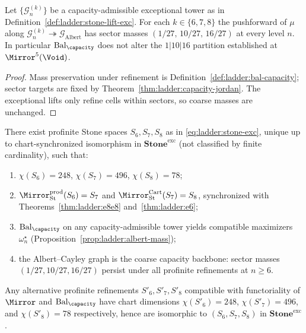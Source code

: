 \begin{proposition}
\label{prop:ladder:albert-mass}
Let $\{\mathcal{G}_n^{(k)}\}$ be a capacity-admissible exceptional tower as in
Definition~\ref{def:ladder:stone-lift-exc}. For each $k\in\{6,7,8\}$ the
pushforward of $\mu$ along
$\mathcal{G}_n^{(k)}\twoheadrightarrow\mathcal{G}_{\mathrm{Albert}}$ has sector
masses $(1/27,\,10/27,\,16/27)$ at every level $n$. In particular
$\mathrm{Bal}_\capacity$ does not alter the $1|10|16$ partition established at
$\Mirror^5(\Void)$.
\end{proposition}

\begin{proof}
Mass preservation under refinement is Definition~\ref{def:ladder:bal-capacity};
sector targets are fixed by Theorem~\ref{thm:ladder:capacity-jordan}. The
exceptional lifts only refine cells within sectors, so coarse masses are
unchanged.
\end{proof}

\begin{theorem}
\label{thm:ladder:stone-e8}
There exist profinite Stone spaces $S_6,S_7,S_8$ as in
\eqref{eq:ladder:stone-exc}, unique up to chart-synchronized isomorphism in
$\mathbf{Stone}^{\mathrm{exc}}$ (not classified by finite cardinality), such that:
\begin{enumerate}[label=(\roman*),leftmargin=*]
  \item $\chi(S_6)=248$, $\chi(S_7)=496$, $\chi(S_8)=78$;
  \item $\Mirror_{\mathrm{St}}^{\mathrm{prod}}(S_6)=S_7$ and
    $\Mirror_{\mathrm{St}}^{\mathrm{Cart}}(S_7)=S_8$, synchronized with
    Theorems~\ref{thm:ladder:e8e8} and~\ref{thm:ladder:e6};
  \item $\mathrm{Bal}_\capacity$ on any capacity-admissible tower yields
    compatible maximizers $\omega^\star_n$ (Proposition~\ref{prop:ladder:albert-mass});
  \item the Albert--Cayley graph is the coarse capacity backbone: sector masses
    $(1/27,10/27,16/27)$ persist under all profinite refinements at $n\geq6$.
\end{enumerate}
Any alternative profinite refinements $S'_6,S'_7,S'_8$ compatible
with functoriality of $\Mirror$ and $\mathrm{Bal}_\capacity$ have chart
dimensions $\chi(S'_6)=248$, $\chi(S'_7)=496$, and $\chi(S'_8)=78$
respectively, hence are isomorphic to $(S_6,S_7,S_8)$ in
$\mathbf{Stone}^{\mathrm{exc}}$.
\end{theorem}

